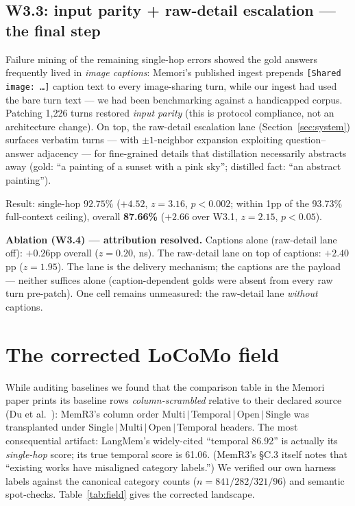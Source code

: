 \documentclass[11pt]{article}
\newcommand{\best}[1]{\textbf{#1}}
\begin{document}
\subsection{W3.3: input parity + raw-detail escalation --- the final
step}
\label{sec:w33}

Failure mining of the remaining single-hop errors showed the gold
answers frequently lived in \emph{image captions}: Memori's published
ingest prepends \texttt{[Shared image: \dots]} caption text to every
image-sharing turn, while our ingest had used the bare turn text ---
we had been benchmarking against a handicapped corpus. Patching 1{,}226
turns restored \emph{input parity} (this is protocol compliance, not
an architecture change). On top, the raw-detail escalation lane
(Section~\ref{sec:system}) surfaces verbatim turns --- with
$\pm1$-neighbor expansion exploiting question--answer adjacency ---
for fine-grained details that distillation necessarily abstracts away
(gold: ``a painting of a sunset with a pink sky''; distilled fact:
``an abstract painting'').

Result: single-hop $92.75\%$ ($+4.52$, $z{=}3.16$, $p{<}0.002$;
within 1pp of the 93.73\% full-context ceiling), overall
\best{87.66\%} ($+2.66$ over W3.1, $z{=}2.15$, $p{<}0.05$).

\textbf{Ablation (W3.4) --- attribution resolved.} Captions alone
(raw-detail lane off): $+0.26$pp overall ($z{=}0.20$, ns). The
raw-detail lane on top of captions: $+2.40$pp ($z{=}1.95$). The lane
is the delivery mechanism; the captions are the payload --- neither
suffices alone (caption-dependent golds were absent from every raw
turn pre-patch). One cell remains unmeasured: the raw-detail lane
\emph{without} captions.

\section{The corrected LoCoMo field}
\label{sec:correction}

While auditing baselines we found that the comparison table in the
Memori paper prints its baseline rows \emph{column-scrambled} relative
to their declared source (Du et al.\ \cite{memr3}): MemR3's column
order Multi\,$|$\,Temporal\,$|$\,Open\,$|$\,Single was transplanted
under Single\,$|$\,Multi\,$|$\,Open\,$|$\,Temporal headers. The most
consequential artifact: LangMem's widely-cited ``temporal 86.92'' is
actually its \emph{single-hop} score; its true temporal score is
61.06. (MemR3's \S C.3 itself notes that ``existing works have
misaligned category labels.'') We verified our own harness labels
against the canonical category counts ($n{=}841/282/321/96$) and
semantic spot-checks. Table~\ref{tab:field} gives the corrected
landscape.
\end{document}
